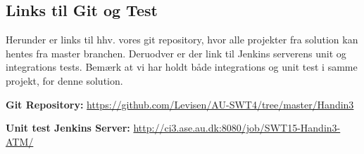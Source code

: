 
\subsection{Links til Git og Test}

Herunder er links til hhv. vores git repository, hvor alle projekter fra solution kan hentes fra master branchen.
Deruodver er der link til Jenkins serverens unit og integrations tests. Bemærk at vi har holdt både integrations og unit test i samme projekt, for denne solution.

\textbf{Git Repository: } \url{https://github.com/Levisen/AU-SWT4/tree/master/Handin3}

\textbf{Unit test Jenkins Server: } \url{http://ci3.ase.au.dk:8080/job/SWT15-Handin3-ATM/}